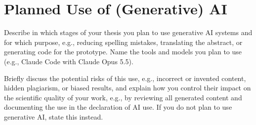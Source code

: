 \section{Planned Use of (Generative) AI}\label{sec:expose:ai-use}

Describe in which stages of your thesis you plan to use generative AI systems and for which purpose, e.g., reducing spelling mistakes, translating the abstract, or generating code for the prototype.
Name the tools and models you plan to use (e.g., Claude Code with Claude Opus 5.5).

Briefly discuss the potential risks of this use, e.g., incorrect or invented content, hidden plagiarism, or biased results, and explain how you control their impact on the scientific quality of your work, e.g., by reviewing all generated content and documenting the use in the declaration of AI use.
If you do not plan to use generative AI, state this instead.
